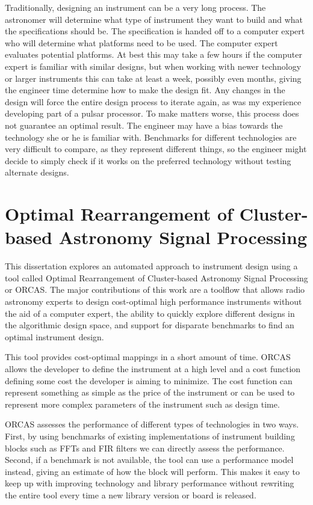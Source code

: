 Traditionally, designing an instrument can be a very long process. 
The astronomer will determine what type of instrument they want to build and what the specifications should be.
The specification is handed off to a computer expert who will determine what platforms need to be used.
The computer expert evaluates potential platforms.
At best this may take a few hours if the computer expert is familiar with similar designs, but when working with newer technology or larger instruments this can take at least a week, possibly even months, giving the engineer time determine how to make the design fit.
Any changes in the design will force the entire design process to iterate again, as was my experience developing part of a pulsar processor.
To make matters worse, this process does not guarantee an optimal result. 
The engineer may have a bias towards the technology she or he is familiar with.
Benchmarks for different technologies are very difficult to compare, as they represent different things, so the engineer might decide to simply check if it works on the preferred technology without testing alternate designs.

\section{Optimal Rearrangement of Cluster-based Astronomy Signal Processing}
This dissertation explores an automated approach to instrument design using a tool called Optimal Rearrangement of Cluster-based Astronomy Signal Processing or ORCAS.
The major contributions of this work are a toolflow that allows radio astronomy experts to design cost-optimal high performance instruments without the aid of a computer expert, the ability to quickly explore different designs in the algorithmic design space, and support for disparate benchmarks to find an optimal instrument design.

This tool provides cost-optimal mappings in a short amount of time.
ORCAS allows the developer to define the instrument at a high level and a cost function defining some cost the developer is aiming to minimize.
The cost function can represent something as simple as the price of the instrument or can be used to represent more complex parameters of the instrument such as design time.

ORCAS assesses the performance of different types of technologies in two ways.
First, by using benchmarks of existing implementations of instrument building blocks such as FFTs and FIR filters we can directly assess the performance.
Second, if a benchmark is not available, the tool can use a performance model instead, giving an estimate of how the block will perform.
This makes it easy to keep up with improving technology and library performance without rewriting the entire tool every time a new library version or board is released. 

